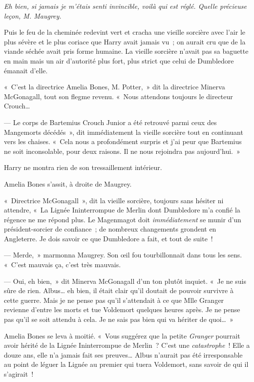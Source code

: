 \emph{Eh bien, si jamais je m'étais senti invincible, voilà qui est réglé. Quelle précieuse leçon, M. Maugrey.}

Puis le feu de la cheminée redevint vert et cracha une vieille sorcière avec l'air le plus sévère et le plus coriace que Harry avait jamais vu~; on aurait cru que de la viande séchée avait pris forme humaine. La vieille sorcière n'avait pas sa baguette en main mais un air d'autorité plus fort, plus strict que celui de Dumbledore émanait d'elle.

«~C'est la directrice Amelia Bones, M. Potter,~» dit la directrice Minerva McGonagall, tout son flegme revenu. «~Nous attendons toujours le directeur Crouch…

--- Le corps de Bartemius Crouch Junior a été retrouvé parmi ceux des Mangemorts décédés~», dit immédiatement la vieille sorcière tout en continuant vers les chaises. «~Cela nous a profondément surpris et j'ai peur que Bartemius ne soit inconsolable, pour deux raisons. Il ne nous rejoindra pas aujourd'hui.~»

Harry ne montra rien de son tressaillement intérieur.

Amelia Bones s'assit, à droite de Maugrey.

«~Directrice McGonagall~», dit la vieille sorcière, toujours sans hésiter ni attendre, «~La Lignée Ininterrompue de Merlin dont Dumbledore m'a confié la régence ne me répond plus. Le Magenmagot doit \emph{immédiatement} se munir d'un président-sorcier de confiance~; de nombreux changements grondent en Angleterre. Je dois savoir ce que Dumbledore a fait, et tout de suite~!

--- Merde,~» marmonna Maugrey. Son œil fou tourbillonnait dans tous les sens. «~C'est mauvais ça, c'est très mauvais.

--- Oui, eh bien,~» dit Minerva McGonagall d'un ton plutôt inquiet. «~Je ne suis sûre de rien. Albus… eh bien, il était clair qu'il doutait de pouvoir survivre à cette guerre. Mais je ne pense pas qu'il s'attendait à ce que Mlle Granger revienne d'entre les morts et tue Voldemort quelques heures après. Je ne pense pas qu'il se soit attendu à cela. Je ne sais pas bien qui va hériter de quoi…~»

Amelia Bones se leva à moitié. «~Vous suggérez que la petite \emph{Granger} pourrait avoir hérité de la Lignée Ininterrompue de Merlin~? C'est une \emph{catastrophe}~! Elle a douze ans, elle n'a jamais fait ses preuves… Albus n'aurait pas été irresponsable au point de léguer la Lignée au premier qui tuera Voldemort, sans savoir de qui il s'agirait~!

